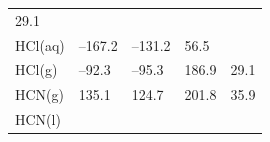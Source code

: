 \documentclass[
  9pt,
]{extbook}
\theoremstyle{definition}
\theoremstyle{definition}
\theoremstyle{definition}
\theoremstyle{remark}
\begin{document}
\begin{longtable}[]{@{}lllll@{}}
\begin{minipage}[t]{0.18\columnwidth}
29.1\strut
\end{minipage}\tabularnewline
\begin{minipage}[t]{0.10\columnwidth}\raggedright
HCl(aq)\strut
\end{minipage} & \begin{minipage}[t]{0.19\columnwidth}\raggedright
--167.2\strut
\end{minipage} & \begin{minipage}[t]{0.20\columnwidth}\raggedright
--131.2\strut
\end{minipage} & \begin{minipage}[t]{0.18\columnwidth}\raggedright
56.5\strut
\end{minipage} & \begin{minipage}[t]{0.18\columnwidth}\raggedright
\strut
\end{minipage}\tabularnewline
\begin{minipage}[t]{0.10\columnwidth}\raggedright
HCl(g)\strut
\end{minipage} & \begin{minipage}[t]{0.19\columnwidth}\raggedright
--92.3\strut
\end{minipage} & \begin{minipage}[t]{0.20\columnwidth}\raggedright
--95.3\strut
\end{minipage} & \begin{minipage}[t]{0.18\columnwidth}\raggedright
186.9\strut
\end{minipage} & \begin{minipage}[t]{0.18\columnwidth}\raggedright
29.1\strut
\end{minipage}\tabularnewline
\begin{minipage}[t]{0.10\columnwidth}\raggedright
HCN(g)\strut
\end{minipage} & \begin{minipage}[t]{0.19\columnwidth}\raggedright
135.1\strut
\end{minipage} & \begin{minipage}[t]{0.20\columnwidth}\raggedright
124.7\strut
\end{minipage} & \begin{minipage}[t]{0.18\columnwidth}\raggedright
201.8\strut
\end{minipage} & \begin{minipage}[t]{0.18\columnwidth}\raggedright
35.9\strut
\end{minipage}\tabularnewline
\begin{minipage}[t]{0.10\columnwidth}\raggedright
HCN(l)\strut

\end{minipage}
\end{longtable}
\end{document}
